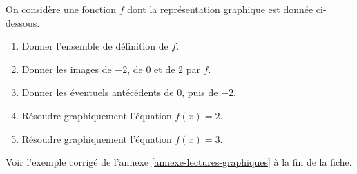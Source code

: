 \documentclass[10pt,a4paper]{article}
\begin{document}
\begin{bloc}
\begin{exo}
On considère une fonction \(f\) dont la représentation graphique est donnée ci-dessous.

\begin{center}
\end{center}

\begin{enumerate}[leftmargin=*]
    \item Donner l'ensemble de définition de \(f\).
    \item Donner les images de \(-2\), de \(0\) et de \(2\) par \(f\).
    \item Donner les éventuels antécédents de \(0\), puis de \(-2\).
    \item Résoudre graphiquement l'équation \(f(x)=2\).
    \item Résoudre graphiquement l'équation \(f(x)=3\).
\end{enumerate}
\end{exo}

\begin{indication}
    Voir l'exemple corrigé de l'annexe \ref{annexe-lectures-graphiques} à la fin de la fiche.
\end{indication}
\end{bloc}
\end{document}
